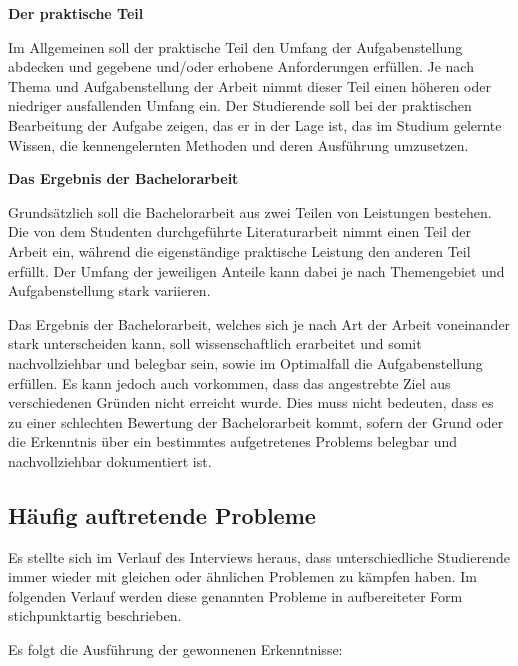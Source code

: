 \documentclass[bibliography=totoc,listof=totoc,BCOR=5mm,DIV=12,oneside]{scrbook}
\begin{document}
\newpage
\par \bigskip \textbf{Der praktische Teil}
\par Im Allgemeinen soll der praktische Teil den Umfang der Aufgabenstellung abdecken und gegebene und/oder erhobene Anforderungen erfüllen. Je nach Thema und Aufgabenstellung der Arbeit nimmt dieser Teil einen höheren oder niedriger ausfallenden Umfang ein.
Der Studierende soll bei der praktischen Bearbeitung der Aufgabe zeigen, das er in der Lage ist, das im Studium gelernte Wissen, die kennengelernten Methoden und deren Ausführung umzusetzen. 
\par \bigskip \textbf{Das Ergebnis der Bachelorarbeit}
\par Grundsätzlich soll die Bachelorarbeit aus zwei Teilen von Leistungen bestehen. Die von dem Studenten durchgeführte Literaturarbeit nimmt einen Teil der Arbeit ein, während die eigenständige praktische Leistung den anderen Teil erfüllt. Der Umfang der jeweiligen Anteile kann dabei je nach Themengebiet und Aufgabenstellung stark variieren.
\par Das Ergebnis der Bachelorarbeit, welches sich je nach Art der Arbeit voneinander stark unterscheiden kann, soll wissenschaftlich erarbeitet und somit nachvollziehbar und belegbar sein, sowie im Optimalfall die Aufgabenstellung erfüllen. Es kann jedoch auch vorkommen, dass das angestrebte Ziel aus verschiedenen Gründen nicht erreicht wurde. Dies muss nicht bedeuten, dass es zu einer schlechten Bewertung der Bachelorarbeit kommt, sofern der Grund oder die Erkenntnis über ein bestimmtes aufgetretenes Problems belegbar und nachvollziehbar dokumentiert ist.

\newpage
\subsection{Häufig auftretende Probleme}
\par Es stellte sich im Verlauf des Interviews heraus, dass unterschiedliche Studierende immer wieder mit gleichen oder ähnlichen Problemen zu kämpfen haben. Im folgenden Verlauf werden diese genannten Probleme in aufbereiteter Form stichpunktartig beschrieben.

\par \medskip Es folgt die Ausführung der gewonnenen Erkenntnisse:
\end{document}

